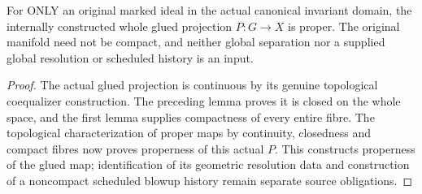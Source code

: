 \begin{theorem}
\label{hir:original-terminal-glued-projection-proper}
\leanok
{}
For ONLY an original marked ideal in the actual canonical invariant domain,
the internally constructed whole glued projection $P:G\to X$ is proper.
The original manifold need not be compact, and neither global separation
nor a supplied global resolution or scheduled history is an input.
\end{theorem}
\begin{proof}
The actual glued projection is continuous by its genuine topological
coequalizer construction. The preceding lemma proves it is closed on the
whole space, and the first lemma supplies compactness of every entire
fibre. The topological characterization of proper maps by continuity,
closedness and compact fibres now proves properness of this actual $P$.
This constructs properness of the glued map; identification of its
geometric resolution data and construction of a noncompact scheduled
blowup history remain separate source obligations.
\end{proof}
